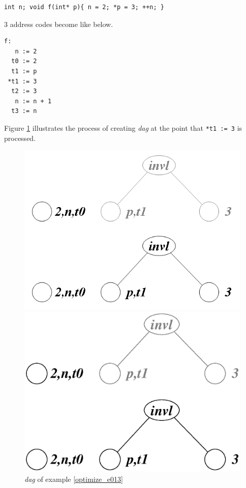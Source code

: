 \begin{Example}
\label{optimize_e013}
\begin{verbatim}
int n; void f(int* p){ n = 2; *p = 3; ++n; }
\end{verbatim}
3 address codes become like below.
\begin{verbatim}
f:
   n := 2
  t0 := 2
  t1 := p
 *t1 := 3
  t2 := 3
   n := n + 1
  t3 := n
\end{verbatim}
Figure \ref{optimize_e014} illustrates the process of creating
{\em dag} at the point that {\tt{*t1 := 3}} is processed.
\begin{figure}[htbp]
\begin{center}
\begin{htmlonly}
\includegraphics[width=1.0\linewidth,height=0.729\linewidth]{opt004.png}
\end{htmlonly}
\begin{latexonly}
\includegraphics[width=1.0\linewidth,height=0.729\linewidth]{opt004.eps}
\end{latexonly}
\caption{{\em dag} of example \ref{optimize_e013}}
\label{optimize_e014}
\end{center}
\end{figure}


\end{Example}

